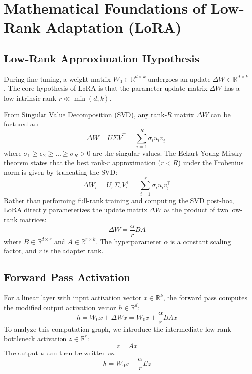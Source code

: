 \documentclass{article}
\begin{document}
\section{Mathematical Foundations of Low-Rank Adaptation (LoRA)}

\subsection{Low-Rank Approximation Hypothesis}
During fine-tuning, a weight matrix $W_0 \in \mathbb{R}^{d \times k}$ undergoes an update $\Delta W \in \mathbb{R}^{d \times k}$. The core hypothesis of LoRA is that the parameter update matrix $\Delta W$ has a low intrinsic rank $r \ll \min(d, k)$. 

From Singular Value Decomposition (SVD), any rank-$R$ matrix $\Delta W$ can be factored as:
\begin{equation}
  \Delta W = U \Sigma V^\top = \sum_{i=1}^R \sigma_i u_i v_i^\top
\end{equation}
where $\sigma_1 \ge \sigma_2 \ge \dots \ge \sigma_R > 0$ are the singular values. The Eckart-Young-Mirsky theorem states that the best rank-$r$ approximation ($r < R$) under the Frobenius norm is given by truncating the SVD:
\begin{equation}
  \Delta W_r = U_r \Sigma_r V_r^\top = \sum_{i=1}^r \sigma_i u_i v_i^\top
\end{equation}
Rather than performing full-rank training and computing the SVD post-hoc, LoRA directly parameterizes the update matrix $\Delta W$ as the product of two low-rank matrices:
\begin{equation}
  \Delta W = \frac{\alpha}{r} B A
\end{equation}
where $B \in \mathbb{R}^{d \times r}$ and $A \in \mathbb{R}^{r \times k}$. The hyperparameter $\alpha$ is a constant scaling factor, and $r$ is the adapter rank. 

\subsection{Forward Pass Activation}
For a linear layer with input activation vector $x \in \mathbb{R}^k$, the forward pass computes the modified output activation vector $h \in \mathbb{R}^d$:
\begin{equation}
  h = W_0 x + \Delta W x = W_0 x + \frac{\alpha}{r} B A x
\end{equation}
To analyze this computation graph, we introduce the intermediate low-rank bottleneck activation $z \in \mathbb{R}^r$:
\begin{equation}
  z = A x
\end{equation}
The output $h$ can then be written as:
\begin{equation}
  h = W_0 x + \frac{\alpha}{r} B z
\end{equation}
\end{document}
